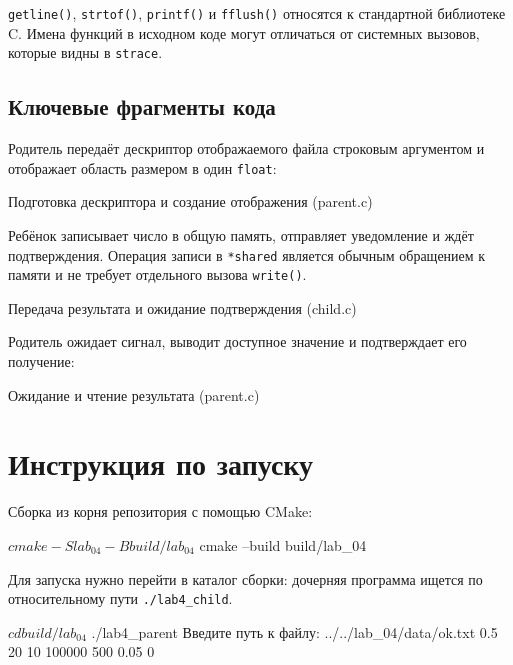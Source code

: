\documentclass[12pt, a4paper]{article}
\begin{document}
\texttt{getline()}, \texttt{strtof()}, \texttt{printf()} и \texttt{fflush()} относятся к стандартной библиотеке C. Имена функций в исходном коде могут отличаться от системных вызовов, которые видны в \texttt{strace}.

\subsection{Ключевые фрагменты кода}

Родитель передаёт дескриптор отображаемого файла строковым аргументом и отображает область размером в один \texttt{float}:

\begin{listingblock}{Подготовка дескриптора и создание отображения (parent.c)}
\end{listingblock}

Ребёнок записывает число в общую память, отправляет уведомление и ждёт подтверждения. Операция записи в \texttt{*shared} является обычным обращением к памяти и не требует отдельного вызова \texttt{write()}.

\begin{listingblock}{Передача результата и ожидание подтверждения (child.c)}
\end{listingblock}

Родитель ожидает сигнал, выводит доступное значение и подтверждает его получение:

\begin{listingblock}{Ожидание и чтение результата (parent.c)}
\end{listingblock}

\section{Инструкция по запуску}

Сборка из корня репозитория с помощью CMake:

\begin{terminal}
$ cmake -S lab_04 -B build/lab_04
$ cmake --build build/lab_04
\end{terminal}

Для запуска нужно перейти в каталог сборки: дочерняя программа ищется по относительному пути \texttt{./lab4\_child}.

\begin{terminal}
$ cd build/lab_04
$ ./lab4_parent
Введите путь к файлу: ../../lab_04/data/ok.txt
0.5
20
10
100000
500
0.05
0
\end{terminal}
\end{document}
